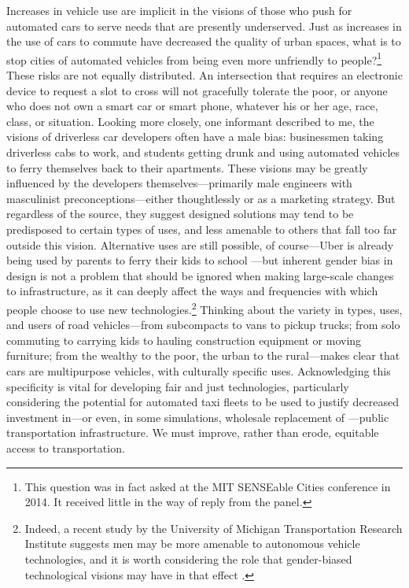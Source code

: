 Increases in vehicle use are
implicit in the visions of those who push for automated cars to serve needs that are presently
underserved. Just as increases in the use of cars to commute have
decreased the quality of urban spaces, what is to stop cities of
automated vehicles from
being even more unfriendly to
people?\footnote{This question was in fact asked at the MIT SENSEable Cities
conference in 2014. It received little in the way of reply from the
panel.} These risks are not equally distributed. An intersection that requires
an electronic device to request a slot 
to cross will not gracefully tolerate the poor, or anyone who
does not own a smart car or smart phone, whatever his or her age,
race, class, or situation. Looking more closely, one informant
described to me, the visions
of driverless car developers
often have a male bias: businessmen
taking driverless cabs to work, and students getting drunk and using
automated vehicles to ferry themselves 
back to their apartments. These visions may be greatly influenced by
the developers themselves---primarily male engineers with masculinist
preconceptions---either thoughtlessly or as a marketing strategy. But
regardless of the source, they suggest designed solutions may tend to
be predisposed to certain types of uses, and less amenable to others
that fall too far outside this vision. Alternative uses are still
possible, of course---Uber is already being used by parents to ferry
their kids to school \cite{hoderParents} \cite{shapiroVan}---but
inherent gender bias in design is not a problem that should be ignored 
when making large-scale changes to infrastructure, as it can deeply
affect the ways and frequencies with which people choose to use new
technologies.\footnote{Indeed, a recent study by the University of Michigan
Transportation Research Institute suggests men may be more
amenable to autonomous vehicle technologies, and it is worth
considering the role that gender-biased technological visions may have
in that
effect \cite{miglioreWomen}.}
Thinking about the variety in types, uses, and users of road vehicles---from
subcompacts to vans to pickup trucks; from solo commuting to carrying kids to
hauling construction equipment or moving furniture; from the wealthy
to the poor, the urban to the rural---makes clear that cars are
multipurpose vehicles, with culturally specific uses.
Acknowledging this
specificity is vital for developing fair and just technologies,
particularly
considering the potential for automated taxi fleets to 
be used to justify decreased investment in---or even, in some
simulations, wholesale replacement of
\cite{frazzoliSingapore}---public transportation infrastructure. We must
improve, rather than erode, equitable access to transportation.

